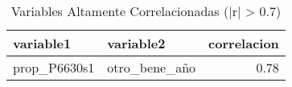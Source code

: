\begin{table}[ht]
\centering
\begin{tabular}{llr}
  \toprule
variable1 & variable2 & correlacion \\ 
  \midrule
prop\_P6630s1 & otro\_bene\_año & 0.78 \\ 
   \bottomrule
\end{tabular}
\caption{Variables Altamente Correlacionadas (|r| > 0.7)} 
\label{tab:high_correlation}
\end{table}
